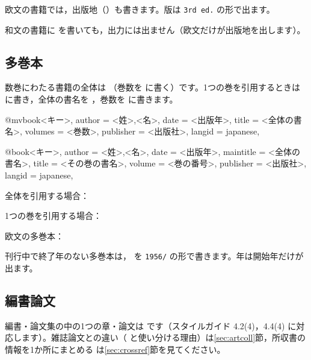 
欧文の書籍では，出版地（）も書きます。版は \texttt{3rd ed.} の形で出ます。


\begin{caution}
和文の書籍に  を書いても，出力には出ません（欧文だけが出版地を出します）。
\end{caution}

\subsection{多巻本}\label{sec:volumes}
数巻にわたる書籍の全体は （巻数を  に書く）です。1つの巻を引用するときは  に書き，全体の書名を ，巻数を  に書きます。

\begin{bibtemplate}
@mvbook{<キー>,
  author    = {<姓>,<名>},
  date      = {<出版年>},
  title     = {<全体の書名>},
  volumes   = {<巻数>},
  publisher = {<出版社>},
  langid    = {japanese},
}

@book{<キー>,
  author    = {<姓>,<名>},
  date      = {<出版年>},
  maintitle = {<全体の書名>},
  title     = {<その巻の書名>},
  volume    = {<巻の番号>},
  publisher = {<出版社>},
  langid    = {japanese},
}
\end{bibtemplate}

全体を引用する場合：


1つの巻を引用する場合：


欧文の多巻本：


刊行中で終了年のない多巻本は， を \texttt{1956/} の形で書きます。年は開始年だけが出ます。


\subsection{編書論文}\label{sec:incollection}
編書・論文集の中の1つの章・論文は  です（スタイルガイド 4.2(4)，4.4(4) に対応します）。雑誌論文との違い（ と使い分ける理由）は\ref{sec:artcoll}節，所収書の情報を1か所にまとめる  は\ref{sec:crossref}節を見てください。

